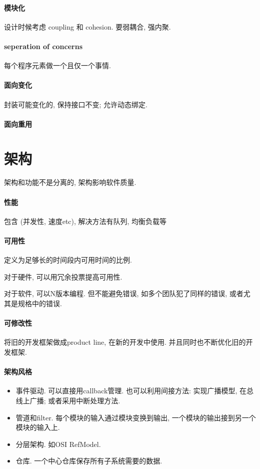 \documentclass{ctexart}
\begin{document}
\paragraph{模块化} 设计时候考虑 coupling 和 cohesion.
    要弱耦合, 强内聚.
\paragraph{seperation of concerns} 每个程序元素做一个且仅一个事情.
\paragraph{面向变化} 封装可能变化的, 保持接口不变; 允许动态绑定.
\paragraph{面向重用} 

\section{架构}
    架构和功能不是分离的, 架构影响软件质量.\par
\paragraph{性能}
    包含 (并发性, 速度etc), 解决方法有队列, 均衡负载等
\paragraph{可用性}
    定义为足够长的时间段内可用时间的比例.\par
    对于硬件, 可以用冗余投票提高可用性.\par
    对于软件, 可以N版本编程. 但不能避免错误, 如多个团队犯了同样的错误, 或者尤其是规格中的错误.
\paragraph{可修改性}
    将旧的开发框架做成product line, 在新的开发中使用. 并且同时也不断优化旧的开发框架.
\paragraph{架构风格}
    \begin{itemize}
        \item 事件驱动. 可以直接用callback管理.
                也可以利用间接方法: 实现广播模型, 在总线上广播; 或者采用中断处理方法.
        \item 管道和filter. 每个模块的输入通过模块变换到输出, 一个模块的输出接到另一个模块的输入上.
        \item 分层架构. 如OSI RefModel.
        \item 仓库. 一个中心仓库保存所有子系统需要的数据.
    \end{itemize}
\end{document}
